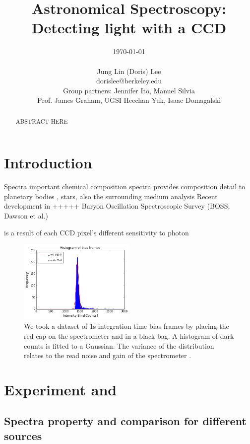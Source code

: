 \documentclass[authoryear, 12pt,5p, times]{elsarticle}
\begin{document}
\begin{frontmatter}
\title{Astronomical Spectroscopy: Detecting light with a CCD}
\author{\today \\ \quad \\Jung Lin (Doris) Lee\\ dorislee@berkeley.edu\\Group partners: Jennifer Ito, Manuel Silvia\\Prof. James Graham, UGSI Heechan Yuk, Isaac Domagalski}
	\begin{abstract}
	ABSTRACT HERE
	\end{abstract}
\end{frontmatter}
\section{Introduction\label{intro}}
Spectra important chemical composition 
spectra provides composition detail to planetary bodies , stars, also the surrounding medium 
analysis
Recent development in +++++ Baryon Oscillation Spectroscopic Survey (BOSS; Dawson et al.)

is a result of each CCD pixel's different sensitivity to photon
\begin{figure}
\includegraphics[width=0.5\textwidth]{figures/bias_histo}
\caption{We took a dataset of 1s integration time bias frames by placing the red cap on the spectrometer and in a black bag. A histogram of dark counts is fitted to a Gaussian. The variance of the distribution relates to the read noise and gain of the spectrometer \citep{ccd_handbook}.}
\end{figure}
\section{Experiment and }
\subsection{Spectra property and comparison for different sources}
\end{document}
